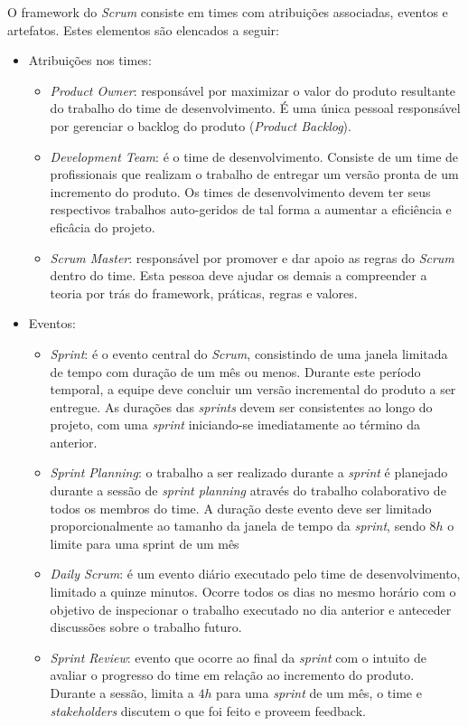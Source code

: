 O framework do \textit{Scrum} consiste em times com atribuições associadas, eventos e artefatos. Estes elementos são elencados a seguir:
\begin{itemize}
    \item Atribuições nos times:
    \begin{itemize}
        \item \textit{Product Owner}: responsável por maximizar o valor do produto resultante do trabalho do time de desenvolvimento. É uma única pessoal responsável por gerenciar o backlog do produto (\textit{Product Backlog}).
        \item \textit{Development Team}: é o time de desenvolvimento. Consiste de um time de profissionais que realizam o trabalho de entregar um versão pronta de um incremento do produto. Os times de desenvolvimento devem ter seus respectivos trabalhos auto-geridos de tal forma a aumentar a eficiência e eficâcia do projeto.
        \item \textit{Scrum Master}: responsável por promover e dar apoio as regras do \textit{Scrum} dentro do time. Esta pessoa deve ajudar os demais a compreender a teoria por trás do framework, práticas, regras e valores.
    \end{itemize}
    \item Eventos:
    \begin{itemize}
        \item \textit{Sprint}: é o evento central do \textit{Scrum}, consistindo de uma janela limitada de tempo com duração de um mês ou menos. Durante este período temporal, a equipe deve concluir um versão incremental do produto a ser entregue. As durações das \textit{sprints} devem ser consistentes ao longo do projeto, com uma \textit{sprint} iniciando-se imediatamente ao término da anterior.
        \item \textit{Sprint Planning}: o trabalho a ser realizado durante a \textit{sprint} é planejado durante a sessão de \textit{sprint planning} através do trabalho colaborativo de todos os membros do time. A duração deste evento deve ser limitado proporcionalmente ao tamanho da janela de tempo da \textit{sprint}, sendo $8h$ o limite para uma sprint de um mês
        \item \textit{Daily Scrum}: é um evento diário executado pelo time de desenvolvimento, limitado a quinze minutos. Ocorre todos os dias no mesmo horário com o objetivo de inspecionar o trabalho executado no dia anterior e anteceder discussões sobre o trabalho futuro.
        \item \textit{Sprint Review}: evento que ocorre ao final da \textit{sprint} com o intuito de avaliar o progresso do time em relação ao incremento do produto. Durante a sessão, limita a $4h$ para uma \textit{sprint} de um mês, o time e \textit{stakeholders} discutem o que foi feito e proveem feedback.

\end{itemize}
\end{itemize}
